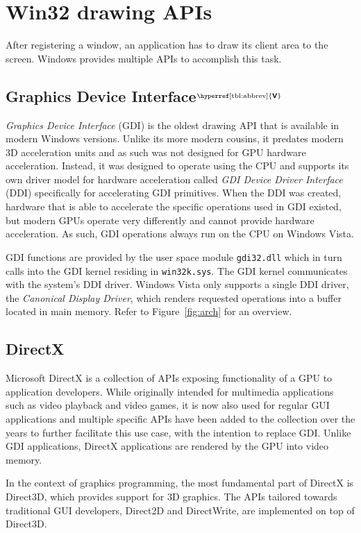 \documentclass[10pt,twocolumn,a4paper]{article}
\newcommand{\bs}[1]{\textbf{\sffamily #1}}
\newcommand{\winver}[1]{$^{\text{\hyperref[tbl:abbrev]{\bs{#1}}}}$}
\newcommand{\winsubsection}[2]{\subsection[#1]{#1\winver{#2}}}
\begin{document}
	\section{Win32 drawing APIs}
		After registering a window, an application has to draw its client area
		to the screen. Windows provides multiple APIs to accomplish this task.

		\winsubsection{Graphics Device Interface}{V} \label{sec:gdi}
			\textit{Graphics Device Interface} (GDI) is the oldest drawing API
			that is available in modern Windows versions. Unlike its more
			modern cousins, it predates modern 3D acceleration units and as such
			was not designed for GPU hardware acceleration. Instead, it was
			designed to operate using the CPU and supports its own driver model
			for hardware acceleration called \textit{GDI Device Driver
			Interface} (DDI) specifically for accelerating GDI
			primitives. When the DDI was created, hardware that is able to
			accelerate the specific operations used in GDI existed, but modern GPUs operate
			very differently and cannot provide hardware acceleration. As such,
			GDI operations always run on the CPU on Windows Vista. \cite{d2dvsgdi}

			GDI functions are provided by the user space module
			\texttt{gdi32.dll} which in turn calls into the GDI kernel residing
			in \texttt{win32k.sys}. The GDI kernel communicates with the
			system's DDI driver. Windows Vista only supports a single DDI driver,
			the \textit{Canonical Display Driver}, which renders requested operations
			into a buffer located in main memory. Refer to Figure~\ref{fig:arch}
			for an overview. \cite{d2dvsgdi, dwmredirect}

		\subsection{DirectX} %
			Microsoft DirectX is a collection of APIs exposing functionality of
			a GPU to application developers. While originally intended for
			multimedia applications such as video playback and video games, it
			is now also used for regular GUI applications and multiple specific
			APIs have been added to the collection over the years to further
			facilitate this use case, with the intention to replace GDI.
			Unlike GDI applications, DirectX applications
			are rendered by the GPU into video memory. \cite{d2dvsgdi}

			In the context of graphics programming, the most fundamental part of
			DirectX is Direct3D, which provides support for 3D graphics. The
			APIs tailored towards traditional GUI developers, Direct2D and
			DirectWrite, are implemented on top of Direct3D.
\end{document}
